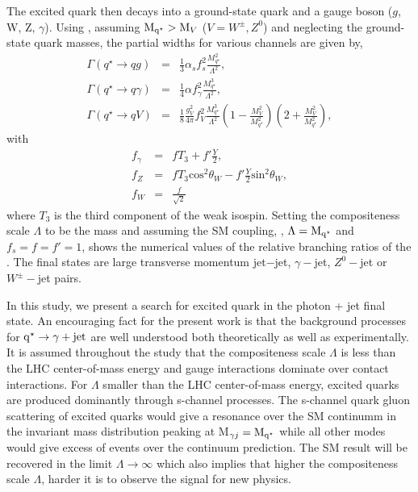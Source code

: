 The excited quark \qstar then decays into a ground-state quark and a gauge boson ($g$, W, Z, $\gamma$). Using \eqn{\ref{eq:Lagrangian1}}, assuming 
$\mathrm{M_{q^\star}} > {\mathrm M_{V}}$ ($V=W^{\pm},Z^{0}$) and neglecting the ground-state quark masses, the partial widths for various channels are given by,
\begin{eqnarray}
\Gamma(q^{\star}\to{qg})  & = & \frac{1}{3}\alpha_{s}f_{s}^{2}\frac{M_{q^{\star}}^{2}}{\Lambda^{2}}, \\
\Gamma(q^{\star}\to{q\gamma}) & = &\frac{1}{4}\alpha f_{\gamma}^{2}\frac{M_{q^{\star}}^{3}}{\Lambda^{2}}, \\
\Gamma(q^{\star}\to{qV}) & = &\frac{1}{8}\frac{g^{2}_{V}}{4\pi}f_{V}^{2}\frac{M_{q^{\star}}^{3}}{\Lambda^{2}}
      \left(1-\frac{M^{2}_{V}}{M^{2}_{q^{\star}}}\right)\left(2+\frac{M^{2}_{V}}{M^{2}_{q^{\star}}}\right),
\end{eqnarray}
with
\begin{eqnarray}
f_{\gamma} & = & fT_{3}+f'\frac{Y}{2}, \\
f_{Z} & = & fT_{3}\text{cos}^{2}\theta_{W} - f'\frac{Y}{2}\text{sin}^{2}\theta_{W}, \\
f_{W} & = & \frac{f}{\sqrt{2}}
\end{eqnarray}
where $T_{3}$ is the third component of the weak isospin. Setting the compositeness scale $\Lambda$ to be the \qstar mass and assuming the SM coupling, 
\ie, $\Lambda=\mathrm{M_{q^\star}}$ and $f_{s}=f=f'=1$, \tab{\ref{Table:qstarBR}} shows the numerical values of the relative branching ratios of the \qstar. The 
\qstar final states are large transverse momentum jet$-$jet, $\gamma-$jet, $Z^{0}-$jet
or $W^{\pm}-$jet pairs. 


In this study, we present a search for excited quark in the photon + jet final state. An encouraging fact for the present work is that the 
background processes for $\mathrm{q^\star}\to\gamma+\mathrm{jet}$ are well understood both theoretically as well as experimentally. It is assumed throughout 
the study that the compositeness scale $\Lambda$ is less than the LHC center-of-mass energy and gauge interactions dominate over contact interactions. 
For $\Lambda$ smaller than the LHC center-of-mass energy, excited quarks are produced dominantly through s-channel processes. The s-channel quark 
gluon scattering of excited quarks would give a resonance over the SM continumm in the \gamjet invariant mass distribution peaking at 
M$_{\gamma j}=\mathrm{M_{q^\star}}$ while all other modes would give excess of events over the continuum prediction. The SM result will be recovered in the 
limit $\Lambda\to\infty$ which also implies that higher the compositeness scale $\Lambda$, harder it is to observe the signal for new physics. 

